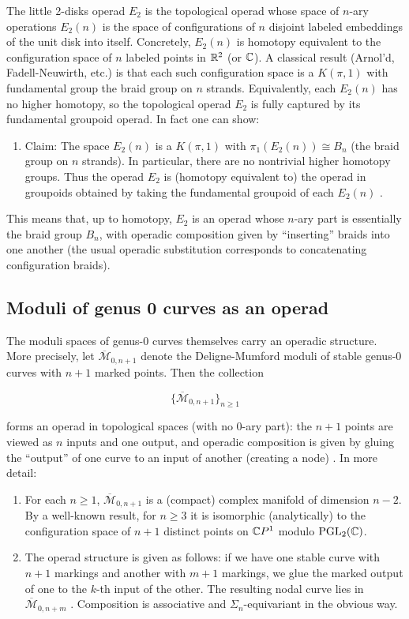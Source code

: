 The little 2-disks operad $E_2$ is the topological operad whose space of $n$-ary operations $E_2(n)$ is the space of configurations of $n$ disjoint labeled embeddings of the unit disk into itself.  Concretely, $E_2(n)$ is homotopy equivalent to the configuration space of $n$ labeled points in $\mathbb{R}^2$ (or $\mathbb{C}$).  A classical result (Arnol'd, Fadell-Neuwirth, etc.) is that each such configuration space is a $K(\pi,1)$ with fundamental group the braid group on $n$ strands.  Equivalently, each $E_2(n)$ has no higher homotopy, so the topological operad $E_2$ is fully captured by its fundamental groupoid operad.  In fact one can show:

\begin{enumerate}
    \item Claim: The space $E_2(n)$ is a $K(\pi,1)$ with $\pi_1(E_2(n))\cong B_n$ (the braid group on $n$ strands).  In particular, there are no nontrivial higher homotopy groups.  Thus the operad $E_2$ is (homotopy equivalent to) the operad in groupoids obtained by taking the fundamental groupoid of each $E_2(n)$ \cite{C_2014}.
\end{enumerate}

This means that, up to homotopy, $E_2$ is an operad whose $n$-ary part is essentially the braid group $B_n$, with operadic composition given by “inserting” braids into one another (the usual operadic substitution corresponds to concatenating configuration braids).

\subsection{Moduli of genus 0 curves as an operad}

The moduli spaces of genus-0 curves themselves carry an operadic structure.  More precisely, let $\overline{\mathcal{M}}_{0,n+1}$ denote the Deligne-Mumford moduli of stable genus-0 curves with $n+1$ marked points.  Then the collection

$$
  \{\overline{\mathcal{M}}_{0,n+1}\}_{n\ge1}
$$

forms an operad in topological spaces (with no $0$-ary part): the $n+1$ points are viewed as $n$ inputs and one output, and operadic composition is given by gluing the “output” of one curve to an input of another (creating a node) \cite{de_brito_operads_2019}. In more detail:

\begin{enumerate}
    \item For each $n\ge1$, $\overline{\mathcal{M}}_{0,n+1}$ is a (compact) complex manifold of dimension $n-2$.  By a well-known result, for $n\ge3$ it is isomorphic (analytically) to the configuration space of $n+1$ distinct points on $\mathbb{C} P^1$ modulo $\mathrm{PGL}_2(\mathbb{C})$.
    \item The operad structure is given as follows: if we have one stable curve with $n+1$ markings and another with $m+1$ markings, we glue the marked output of one to the $k$-th input of the other.  The resulting nodal curve lies in $\overline{\mathcal{M}}_{0,n+m}$ \cite{de_brito_operads_2019}. Composition is associative and $\Sigma_n$-equivariant in the obvious way.
\end{enumerate}

